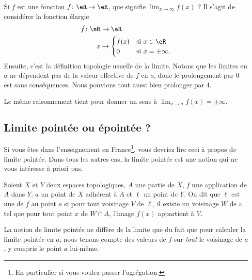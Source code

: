 Si \( f\) est une fonction \( f\colon \eR\to \eR\), que signifie \( \lim_{x\to \infty} f(x)\) ? Il s'agit de considérer la fonction élargie
\begin{equation}
    \begin{aligned}
        \tilde f\colon \bar \eR&\to \bar\eR \\
        x&\mapsto \begin{cases}
            f(x)    &   \text{si } x\in \eR\\
            0    &    \text{si } x=\pm\infty.
        \end{cases}
    \end{aligned}
\end{equation}
Ensuite, c'est la définition topologie usuelle de la limite. Notons que les limites en \( a\) ne dépendent pas de la valeur effective de \( f\) en \( a\), donc le prolongement par \( 0\) est sans conséquences. Nous pouvions tout aussi bien prolonger par \( 4\).

Le même raisonnement tient pour donner un sens à \( \lim_{x\to a} f(x)=\pm \infty\).

\subsection{Limite pointée ou épointée ?}
\label{SUBSECooVHKCooYRFgrb}

Si vous êtes dans l'enseignement en France\footnote{En particulier si vous voulez passer l'agrégation.}, vous devriez lire ceci à propos de limite pointée. Dans tous les autres cas, la limite pointée est une notion qui ne vous intéresse à priori pas.

\begin{definition}
    Soient $X$ et $Y$ deux espaces topologiques, $A$ une partie de $X$, $f$ une application de $A$ dans $Y$, $a$ un point de $X$ adhérent à $A$ et \(\ell \) un point de $Y$. On dit que \( \ell\) est une  de $f$ au point $a$ si pour tout voisinage $V$ de \( \ell\), il existe un voisinage $W$ de a tel que pour tout point $x$ de $W\cap A$, l'image $f(x)$ appartient à $V$.
\end{definition}

La notion de limite pointée ne diffère de la limite que du fait que pour calculer la limite pointée en \( a\), nous tenons compte des valeurs de \( f\) sur \emph{tout} le voisinage de \( a\), y compris le point \( a\) lui-même.

